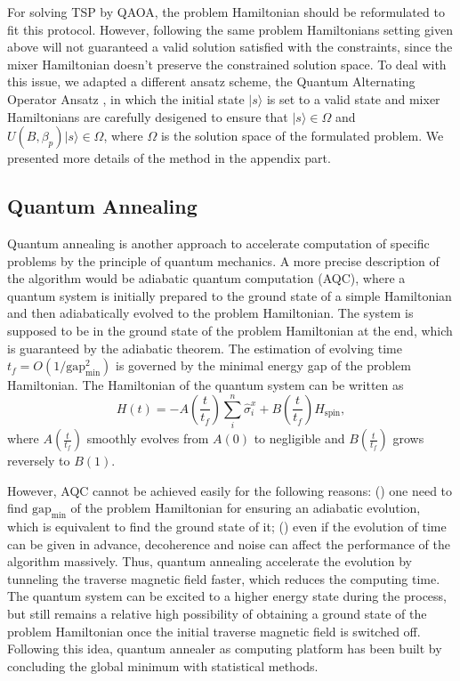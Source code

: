 \documentclass[aps,pra,twocolumn,superscriptaddress]{revtex4-2}
\begin{document}
For solving TSP by QAOA, the problem Hamiltonian should be reformulated to fit this protocol. However, following the same problem Hamiltonians setting given above will not guaranteed a valid solution satisfied with the constraints, since the mixer Hamiltonian doesn't preserve the constrained solution space. To deal with this issue, we adapted a different ansatz scheme, the Quantum Alternating Operator Ansatz \cite{}, in which the initial state $|s\rangle$ is set to a valid state and mixer Hamiltonians are carefully desigened to ensure that 
$|s\rangle \in \Omega$ and $U(B,\beta_p)|s\rangle \in \Omega$, where $\Omega$ is the solution space of the formulated problem. We presented more details of the method in the appendix part.


\subsection{Quantum Annealing}
Quantum annealing is another approach to accelerate computation of specific problems by the principle of quantum mechanics. A more precise description of the algorithm would be adiabatic quantum computation (AQC), where a quantum system is initially prepared to the ground state of a simple Hamiltonian and then adiabatically evolved to the problem Hamiltonian. The system is supposed to be in the ground state of the problem Hamiltonian at the end, which is guaranteed by the adiabatic theorem. The estimation of evolving time $t_f=O(1/\text{gap}^2_{\min})$ is governed by the minimal energy gap of the problem Hamiltonian. The Hamiltonian of the quantum system can be written as
\begin{equation}
\label{eq:H_2D}
H(t)=-A(\frac{t}{t_f})\sum_i^n\hat{\sigma}_i^x+B(\frac{t}{t_f})H_{\text{spin}},
\end{equation}
where $A(\frac{t}{t_f})$ smoothly evolves from $A(0)$ to negligible and $B(\frac{t}{t_f})$ grows reversely to $B(1)$. 

However, AQC cannot be achieved easily for the following reasons: () one need to find $\text{gap}_{\min}$ of the problem Hamiltonian for ensuring an adiabatic evolution, which is equivalent to find the ground state of it; () even if the evolution of time can be given in advance, decoherence and noise can affect the performance of the algorithm massively. Thus, quantum annealing accelerate the evolution by tunneling the traverse magnetic field faster, which reduces the computing time. The quantum system can be excited to a higher energy state during the process, but still remains a relative high possibility of obtaining a ground state of the problem Hamiltonian once the initial traverse magnetic field is switched off. Following this idea, quantum annealer as computing platform has been built by concluding the global minimum with statistical methods.
\end{document}
